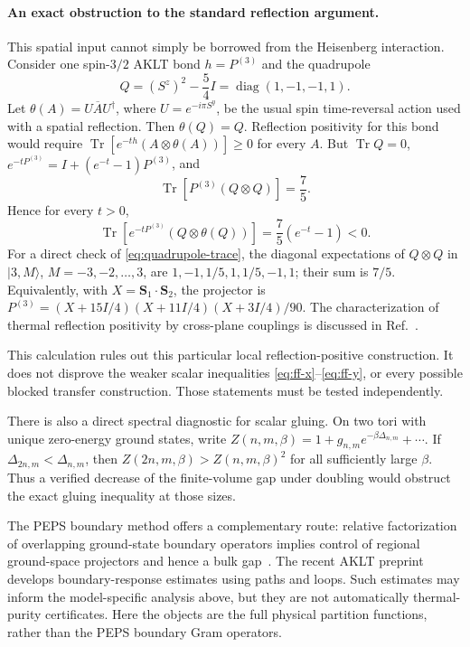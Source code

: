 \documentclass[11pt]{article}
\newcommand{\Tr}{\operatorname{Tr}}
\begin{document}
\paragraph{An exact obstruction to the standard reflection argument.}
This spatial input cannot simply be borrowed from the Heisenberg
interaction. Consider one spin-\(3/2\) AKLT bond
\(h=P^{(3)}\) and the quadrupole
\[
	Q=(S^z)^2-\frac54I=\operatorname{diag}(1,-1,-1,1).
\]
Let \(\theta(A)=U\overline A U^\dagger\), where
\(U=e^{-i\pi S^y}\), be the usual spin time-reversal action used with
a spatial reflection. Then \(\theta(Q)=Q\). Reflection positivity
for this bond would require
\(\Tr[e^{-t h}(A\otimes\theta(A))]\ge0\) for every \(A\).
But \(\Tr Q=0\), \(e^{-tP^{(3)}}=I+(e^{-t}-1)P^{(3)}\), and
\begin{equation}
	\Tr[P^{(3)}(Q\otimes Q)]=\frac75.
	\label{eq:quadrupole-trace}
\end{equation}
Hence for every \(t>0\),
\begin{equation}
	\boxed{\Tr[e^{-tP^{(3)}}(Q\otimes\theta(Q))]
		=\frac75(e^{-t}-1)<0.}
	\label{eq:rp-obstruction}
\end{equation}
For a direct check of \eqref{eq:quadrupole-trace}, the diagonal
expectations of \(Q\otimes Q\) in \(\lvert3,M\rangle\),
\(M=-3,-2,\ldots,3\), are
\(1,-1,1/5,1,1/5,-1,1\); their sum is \(7/5\).
Equivalently, with \(X=\mathbf S_1\cdot\mathbf S_2\), the projector is
\(P^{(3)}=(X+15I/4)(X+11I/4)(X+3I/4)/90\).
The characterization of thermal reflection positivity by cross-plane
couplings is discussed in Ref.~\cite{jaffe}.

This calculation rules out this particular local reflection-positive
construction. It does not disprove the weaker scalar inequalities
\eqref{eq:ff-x}--\eqref{eq:ff-y}, or every possible blocked transfer
construction. Those statements must be tested independently.

There is also a direct spectral diagnostic for scalar gluing. On two
tori with unique zero-energy ground states, write
\(Z(n,m,\beta)=1+g_{n,m}e^{-\beta\Delta_{n,m}}+\cdots\).
If \(\Delta_{2n,m}<\Delta_{n,m}\), then
\(Z(2n,m,\beta)>Z(n,m,\beta)^2\) for all sufficiently large
\(\beta\). Thus a verified decrease of the finite-volume gap under
doubling would obstruct the exact gluing inequality at those sizes.

The PEPS boundary method offers a complementary route: relative
factorization of overlapping ground-state boundary operators implies
control of regional ground-space projectors and hence a bulk
gap~\cite{klp}. The recent AKLT preprint~\cite{kastoryano} develops
boundary-response estimates using paths and loops. Such estimates may
inform the model-specific analysis above, but they are not automatically
thermal-purity certificates. Here the objects are the full physical
partition functions, rather than the PEPS boundary Gram operators.
\end{document}
